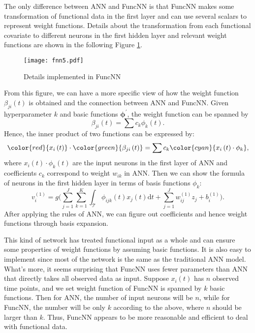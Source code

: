 The only difference between ANN and FuncNN is that FuncNN makes some transformation of functional data in the first layer and can use several scalars to represent weight functions. Details about the transformation from each functional covariate to different neurons in the first hidden layer and relevant weight functions are shown in the following Figure \ref{fig:fnn5}.
\begin{figure}[H] %
\centering %
\texttt{[image: fnn5.pdf]} %
\caption{Details implemented in FuncNN} %
\label{fig:fnn5} %
\end{figure}
From this figure, we can have a more specific view of how the weight function $\beta_{ji}(t)$ is obtained and the connection between ANN and FuncNN. Given hyperparameter $k$ and basic functions $\bm \phi^\prime$, the weight function can be spanned by
$$\beta_{ji}\left(t\right)=\sum c_k\phi_k\left(t\right).$$
Hence, the inner product of two functions can be expressed by:
$${\color{red}{x_i\left(t\right)}}\cdot{\color{green}{\beta_{ji}\left(t\right)}}=\sum c_k{\color{cyan}{x_i\left(t\right)\cdot\phi_k}},$$
where $x_i(t)\cdot\phi_k(t)$ are the input neurons in the first layer of ANN and coefficients $c_k$ correspond to weight $w_{ik}$ in ANN. Then we can show the formula of neurons in the first hidden layer in terms of basis functions $\phi_k$:
$$
v_i^{(1)} = g\Big(\sum_{j=1}^J \sum_{k=1}^{K}\int_\mathcal{T}\phi_{ijk}(t)x_j(t)\mathrm{d}t + \sum_{j=1}^Jw_{ij}^{(1)}z_j + b_i^{(1)}\Big).
$$
After applying the rules of ANN, we can figure out coefficients and hence weight functions through basis expansion.

This kind of network has treated functional input as a whole and can ensure some properties of weight functions by assuming basic functions. It is also easy to implement since most of the network is the same as the traditional ANN model. What’s more, it seems surprising that FuncNN uses fewer parameters than ANN that directly takes all observed data as input. Suppose $x_i(t)$ has $n$ observed time points, and we set weight function of FuncNN is spanned by $k$ basic functions. Then for ANN, the number of input neurons will be $n$, while for FuncNN, the number will be only $k$ according to the above, where $n$ should be larger than $k$. Thus, FuncNN appears to be more reasonable and efficient to deal with functional data.

